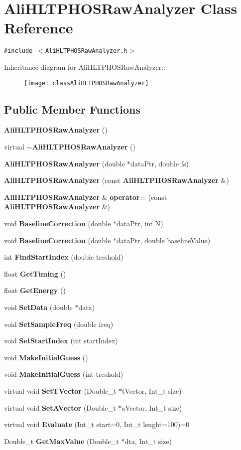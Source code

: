 \section{Ali\-HLTPHOSRaw\-Analyzer Class Reference}
\label{classAliHLTPHOSRawAnalyzer}
{\tt \#include $<$Ali\-HLTPHOSRaw\-Analyzer.h$>$}

Inheritance diagram for Ali\-HLTPHOSRaw\-Analyzer::\begin{figure}[H]
\begin{center}
\leavevmode
\texttt{[image: classAliHLTPHOSRawAnalyzer]}
\end{center}
\end{figure}
\subsection*{Public Member Functions}
\begin{CompactItemize}
\item 
{\bf Ali\-HLTPHOSRaw\-Analyzer} ()
\item 
virtual {\bf $\sim$Ali\-HLTPHOSRaw\-Analyzer} ()
\item 
{\bf Ali\-HLTPHOSRaw\-Analyzer} (double $\ast$data\-Ptr, double fs)
\item 
{\bf Ali\-HLTPHOSRaw\-Analyzer} (const {\bf Ali\-HLTPHOSRaw\-Analyzer} \&)
\item 
{\bf Ali\-HLTPHOSRaw\-Analyzer} \& {\bf operator=} (const {\bf Ali\-HLTPHOSRaw\-Analyzer} \&)
\item 
void {\bf Baseline\-Correction} (double $\ast$data\-Ptr, int N)
\item 
void {\bf Baseline\-Correction} (double $\ast$data\-Ptr, double baseline\-Value)
\item 
int {\bf Find\-Start\-Index} (double treshold)
\item 
float {\bf Get\-Timing} ()
\item 
float {\bf Get\-Energy} ()
\item 
void {\bf Set\-Data} (double $\ast$data)
\item 
void {\bf Set\-Sample\-Freq} (double freq)
\item 
void {\bf Set\-Start\-Index} (int start\-Index)
\item 
void {\bf Make\-Initial\-Guess} ()
\item 
void {\bf Make\-Initial\-Guess} (int treshold)
\item 
virtual void {\bf Set\-TVector} (Double\_\-t $\ast$t\-Vector, Int\_\-t size)
\item 
virtual void {\bf Set\-AVector} (Double\_\-t $\ast$a\-Vector, Int\_\-t size)
\item 
virtual void {\bf Evaluate} (Int\_\-t start=0, Int\_\-t lenght=100)=0
\item 
Double\_\-t {\bf Get\-Max\-Value} (Double\_\-t $\ast$dta, Int\_\-t size)
\end{CompactItemize}
